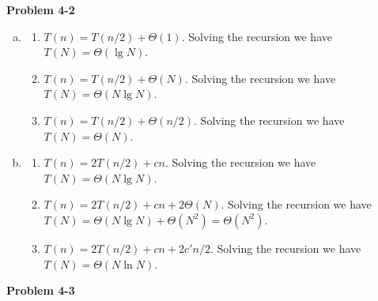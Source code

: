 \documentclass{article}
\begin{document}
\noindent\textbf{Problem 4-2}\\
\begin{enumerate}[a.]
\item 
\begin{enumerate}[1.]
\item $T(n) = T(n/2) + \Theta(1)$.  Solving the recursion we have $T(N) = \Theta(\lg N)$.

\item $T(n) = T(n/2) + \Theta(N)$.  Solving the recursion we have $T(N) = \Theta(N \lg N)$.

\item $T(n) = T(n/2) + \Theta(n/2)$. Solving the recursion we have $T(N) = \Theta(N)$. \\

\end{enumerate}
\item
\begin{enumerate}[1.]
  \item $T(n) = 2T(n/2) + cn$. Solving the recursion we have $T(N) = \Theta(N\lg N)$.

\item $T(n) = 2T(n/2) + cn + 2\Theta(N)$.  Solving the recursion we have $T(N) = \Theta(N\lg N) + \Theta(N^2) = \Theta(N^2)$.

\item $T(n) = 2T(n/2) + cn + 2c'n/2$.  Solving the recursion we have $T(N) = \Theta(N\ln N)$. \\

\end{enumerate}
\end{enumerate}
\noindent\textbf{Problem 4-3}\\
\end{document}
